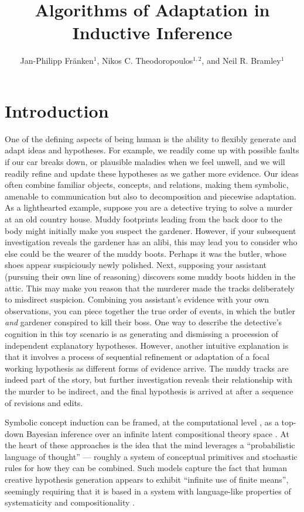 \documentclass[doc,natbib,floatsintext]{apa7}
\title{Algorithms of Adaptation in Inductive Inference}
\author{Jan-Philipp Fränken$^{1}$, Nikos C. Theodoropoulos$^{1,2}$, and Neil R. Bramley$^1$}
\affiliation{$^1$ Department of Psychology, University of Edinburgh \\
            $^2$ Laboratory of Experimental Psychology, Suor Orsola Benincasa University of Naples}
\begin{document}
\setlength{\parindent}{2em}
\maketitle



\section{Introduction}
One of the defining aspects of being human is the ability to flexibly generate and adapt ideas and hypotheses. For example, we readily come up with possible faults if our car breaks down, or plausible maladies when we feel unwell, and we will readily refine and update these hypotheses as we gather more evidence. Our ideas often combine familiar objects, concepts, and relations, making them symbolic, amenable to communication but also to decomposition and piecewise adaptation. As a lighthearted example, suppose you are a detective trying to solve a murder at an old country house. Muddy footprints leading from the back door to the body might initially make you suspect the gardener. However, if your subsequent investigation reveals the gardener has an alibi, this may lead you to consider who else could be the wearer of the muddy boots. Perhaps it was the butler, whose shoes appear suspiciously newly polished. Next, supposing your assistant (pursuing their own line of reasoning) discovers some muddy boots hidden in the attic. This may make you reason that the murderer made the tracks deliberately to misdirect suspicion. Combining you assistant's evidence with your own observations, you can piece together the true order of events, in which the butler \emph{and} gardener conspired to kill their boss. One way to describe the detective's cognition in this toy scenario is as generating and dismissing a procession of independent explanatory hypotheses. However, another intuitive explanation is that it involves a process of sequential refinement or adaptation of a focal working hypothesis as different forms of evidence arrive. The muddy tracks are indeed part of the story, but further investigation reveals their relationship with the murder to be indirect, and the final hypothesis is arrived at after a sequence of revisions and edits. 

Symbolic concept induction can be framed, at the computational level \citep{marrfreeman}, as a top-down Bayesian inference over an infinite latent compositional theory space \citep{goodman2008rational, piantadosi2016logical,  bramley2018grounding}. At the heart of these approaches is the idea that the mind leverages a ``probabilistic language of thought'' --- roughly a system of conceptual primitives and stochastic rules for how they can be combined. Such models capture the fact that human creative hypothesis generation appears to exhibit ``infinite use of finite means'', seemingly requiring that it is based in a system with language-like properties of systematicity and compositionality \citep{fodor1975language, lake2015human}.
\end{document}
